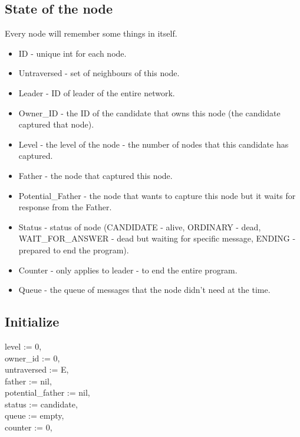 \documentclass{article}
\begin{document}
\subsection*{State of the node}
Every node will remember some things in itself.
\begin{itemize}
    \item ID - unique int for each node.
    \item Untraversed - set of neighbours of this node.
    \item Leader - ID of leader of the entire network.
    \item Owner\_ID - the ID of the candidate that owns this node (the candidate captured that node).
    \item Level - the level of the node - the number of nodes that this candidate has captured.
    \item Father - the node that captured this node.
    \item Potential\_Father - the node that wants to capture this node but it waits for response from the Father.
    \item Status - status of node (CANDIDATE - alive, ORDINARY - dead, WAIT\_FOR\_ANSWER - dead but waiting for specific message, ENDING - prepared to end the program).
    \item Counter - only applies to leader - to end the entire program.
    \item Queue - the queue of messages that the node didn't need at the time.
\end{itemize}

\subsection*{Initialize}
level := 0,\\ owner\_id := 0,\\ untraversed := E,\\ father := nil,\\ potential\_father := nil,\\ status := candidate,\\ queue := empty, \\ counter := 0,\\
\end{document}
